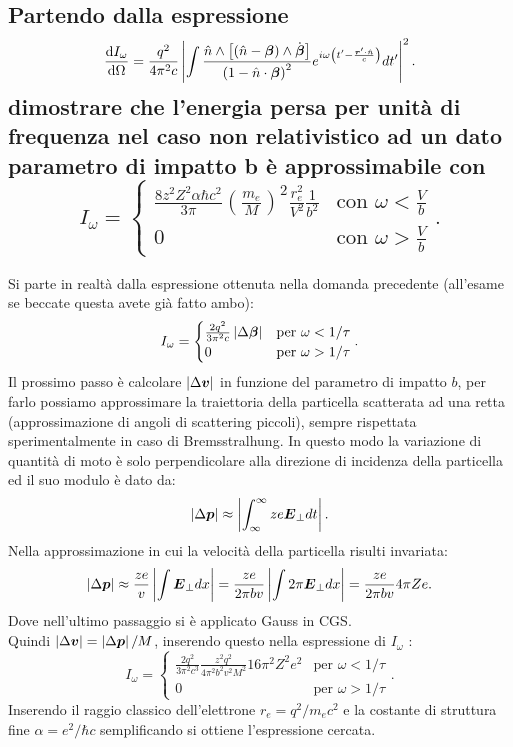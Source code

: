 \subsection[]{Partendo dalla espressione \[ 
	\frac{\mbox{d} I_{\omega}}{\mbox{d} \Omega} = \frac{q^2}{4\pi^2 c}
	\left|\int\frac{\hat{n}\wedge\left[\left(\hat{n}-\boldsymbol{\beta}\right)\wedge\dot{\boldsymbol{\beta}}\right]}{\left(1-\hat{n}\cdot\boldsymbol{\beta}\right)^2}
	e^{i\omega\left(t'-\frac{\boldsymbol{r}'\cdot\hat{n}}{c}\right)}dt'\right|^2.\] 
dimostrare che l’energia persa per unità di frequenza nel caso non relativistico ad un dato parametro di impatto b è approssimabile con
\[
	I_{\omega}=
	\begin{cases}
		\frac{8z^2Z^2\alpha \hbar c^2}{3\pi}\left( \frac{m_e}{M} \right) ^2 \frac{r^2_e}{V^2}\frac{1}{b ^2} & \text{con } \omega< \frac{V}{b}\\
		0 & \text{con } \omega > \frac{V}{b}
	\end{cases}
.\] 
}
\label{sec:4.b.7}
Si parte in realtà dalla espressione ottenuta nella domanda precedente (all'esame se beccate questa avete già fatto ambo):
\[
	I_{\omega}=
	\begin{cases}
		\frac{2q^2}{3\pi^2 c}\left| \Delta \boldsymbol{\beta} \right|  &\text{per } \omega< 1 /\tau\\  
		0 & \text{per } \omega > 1 /\tau
	\end{cases}.
\]
Il prossimo passo è calcolare $\left| \Delta \boldsymbol{v} \right| $ in funzione del parametro di impatto $b$, per farlo possiamo approssimare la traiettoria della particella scatterata ad una retta (approssimazione di angoli di scattering piccoli), sempre rispettata sperimentalmente in caso di Bremsstralhung. In questo modo la variazione di quantità di moto è solo perpendicolare alla direzione di incidenza della particella ed il suo modulo è dato da:
\[
	\left| \Delta \boldsymbol{p} \right| \approx \left| \int_{\infty}^{\infty} ze \boldsymbol{E}_{\bot} dt \right| 
.\] 
Nella approssimazione in cui la velocità della particella risulti invariata:
\[
	\left| \Delta \boldsymbol{p} \right| \approx \frac{ze}{v} \left| \int \boldsymbol{E}_{\bot} dx\right|= 
	\frac{ze}{2\pi b v} \left| \int 2\pi \boldsymbol{E}_{\bot}dx \right|= \frac{ze}{2\pi b v } 4\pi Ze
.\] 
Dove nell'ultimo passaggio si è applicato Gauss in CGS.\\
Quindi $\left| \Delta \boldsymbol{v} \right| = \left| \Delta \boldsymbol{p} \right| /M$, inserendo questo nella espressione di $I_{\omega}$ :
\[
	I_{\omega}=
	\begin{cases}
		\frac{2q^2}{3\pi^2 c^3}\frac{z^2q^2}{4 \pi^2b^2v ^2M^2}16 \pi^2 Z^2 e^2  &\text{per } \omega< 1 /\tau\\  
		0 & \text{per } \omega > 1 /\tau
	\end{cases}
.\] 
Inserendo il raggio classico dell'elettrone $r_e = q^2 / m_e c^2$ e la costante di struttura fine $\alpha=e^2 / \hbar c$ semplificando si ottiene l'espressione cercata.

